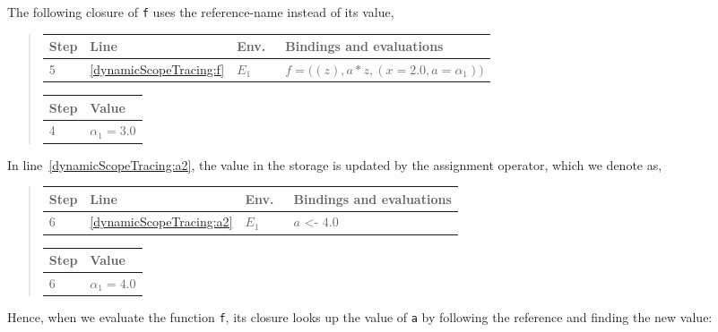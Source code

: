 \documentclass[fsharpNotes.tex]{subfiles}
\begin{document}
The following closure of \lstinline!f! uses the reference-name instead of its value,
\begin{quote}
  \begin{tabular*}{0.65\linewidth}[t]{l|lll}
    Step & Line & Env.\ & Bindings and evaluations\\
    \hline
    5 &\ref{dynamicScopeTracing:f} & $E_1$ & $f = \big((z), a*z, (x=2.0, a=\alpha_1)\big)$\\
  \end{tabular*}
  \hspace*{0.03\linewidth}
  \begin{tabular*}{0.25\linewidth}[t]{l|l}
    Step & Value\\
    \hline
    4 & $\alpha_1 = 3.0$\\
  \end{tabular*}
\end{quote}
In line~\ref{dynamicScopeTracing:a2}, the value in the storage is updated by the assignment operator, which we denote as,
\begin{quote}
  \begin{tabular*}{0.65\linewidth}[t]{l|lll}
    Step & Line & Env.\ & Bindings and evaluations\\
    \hline
    6 &\ref{dynamicScopeTracing:a2} & $E_1$ & $a \text{ <- } 4.0$\\
  \end{tabular*}
  \hspace*{0.03\linewidth}
  \begin{tabular*}{0.25\linewidth}[t]{l|l}
    Step & Value\\
    \hline
    6 & $\alpha_1 = 4.0$\\
  \end{tabular*}
\end{quote}
Hence, when we evaluate the function \lstinline{f}, its closure looks up the value of \lstinline{a} by following the reference and finding the new value:
\end{document}
